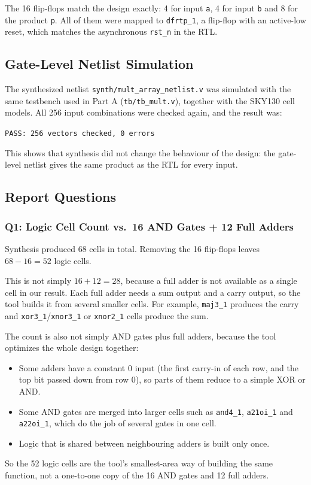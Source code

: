 \documentclass[11pt,a4paper]{article}
\begin{document}
The 16 flip-flops match the design exactly: 4 for input \texttt{a}, 4 for
input \texttt{b} and 8 for the product \texttt{p}. All of them were mapped to
\texttt{dfrtp\_1}, a flip-flop with an active-low reset, which matches the
asynchronous \texttt{rst\_n} in the RTL.

\subsection{Gate-Level Netlist Simulation}

The synthesized netlist \texttt{synth/mult\_array\_netlist.v} was simulated
with the same testbench used in Part A (\texttt{tb/tb\_mult.v}), together with
the SKY130 cell models. All 256 input combinations were checked again, and the
result was:

\begin{center}
\texttt{PASS: 256 vectors checked, 0 errors}
\end{center}

This shows that synthesis did not change the behaviour of the design: the
gate-level netlist gives the same product as the RTL for every input.

\subsection{Report Questions}

\subsubsection{Q1: Logic Cell Count vs.\ 16 AND Gates + 12 Full Adders}

Synthesis produced 68 cells in total. Removing the 16 flip-flops leaves
$68 - 16 = 52$ logic cells.

This is not simply $16 + 12 = 28$, because a full adder is not available as a
single cell in our result. Each full adder needs a sum output and a carry
output, so the tool builds it from several smaller cells. For example,
\texttt{maj3\_1} produces the carry and \texttt{xor3\_1}/\texttt{xnor3\_1} or
\texttt{xnor2\_1} cells produce the sum.

The count is also not simply AND gates plus full adders, because the tool
optimizes the whole design together:
\begin{itemize}
  \item Some adders have a constant 0 input (the first carry-in of each row,
        and the top bit passed down from row 0), so parts of them reduce to a
        simple XOR or AND.
  \item Some AND gates are merged into larger cells such as \texttt{and4\_1},
        \texttt{a21oi\_1} and \texttt{a22oi\_1}, which do the job of several
        gates in one cell.
  \item Logic that is shared between neighbouring adders is built only once.
\end{itemize}
So the 52 logic cells are the tool's smallest-area way of building the same
function, not a one-to-one copy of the 16 AND gates and 12 full adders.
\end{document}
